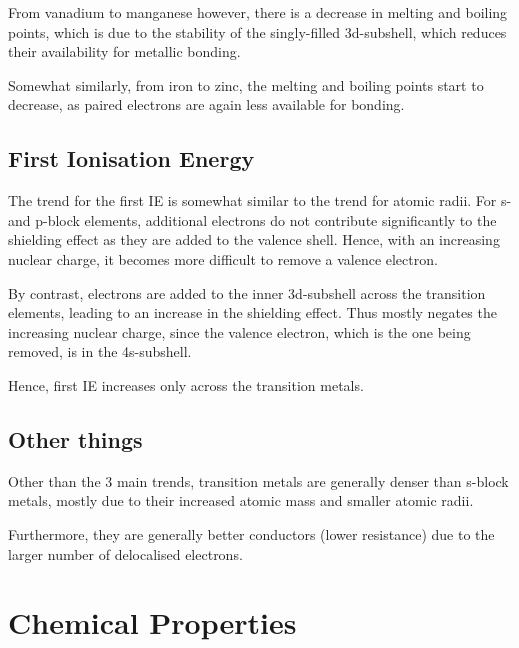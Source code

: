 			From vanadium to manganese however, there is a decrease in melting and boiling points, which is due to the stability of the
			singly-filled 3d-subshell, which reduces their availability for metallic bonding.

			Somewhat similarly, from iron to zinc, the melting and boiling points start to decrease, as paired electrons are again less
			available for bonding.



		\subsection{First Ionisation Energy}

			The trend for the first IE is somewhat similar to the trend for atomic radii. For s- and p-block elements, additional electrons
			do not contribute significantly to the shielding effect as they are added to the valence shell. Hence, with an increasing nuclear
			charge, it becomes more difficult to remove a valence electron.


			By contrast, electrons are added to the inner 3d-subshell across the transition elements, leading to an increase in the shielding
			effect. Thus mostly negates the increasing nuclear charge, since the valence electron, which is the one being removed, is in the
			4s-subshell.

			Hence, first IE increases only  across the transition metals.



		\subsection{Other things}

			Other than the 3 main trends, transition metals are generally denser than s-block metals, mostly due to their increased atomic
			mass and smaller atomic radii.

			Furthermore, they are generally better conductors (lower resistance) due to the larger number of delocalised electrons.





	\pagebreak
	\section{Chemical Properties}

